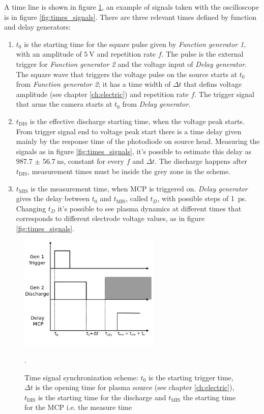 A time line is shown in figure \ref{fig:times}, an example of signals taken with the oscilloscope is in figure \ref{fig:times_signals}. There are three relevant times defined by function and delay generators:
\begin{enumerate}
 \item $t_{0}$ is the starting time for the square pulse given by \emph{Function generator 1}, with an amplitude of $\SI{5}{\volt}$ and repetition rate $f$. The pulse is the external trigger for \emph{Function generator 2} and the voltage input of \emph{Delay generator}. The square wave that triggers the voltage pulse on the source starts at $t_{0}$ from \emph{Function generator 2}; it has a time width of $\Delta t$ that defins voltage amplitude (see chapter \ref{ch:electric}) and repetition rate $f$. The trigger signal that arms the camera starts at $t_{0}$ from \emph{Delay generator}.
 \item $t_{\text{DIS}}$ is the effective discharge starting time, when the voltage peak starts. From trigger signal end to voltage peak start there is a time delay given mainly by the response time of the photodiode on source head. Measuring the signals as in figure \ref{fig:times_signals}, it's possible to estimate this delay as $\SI{987.7(567)}{\nano\second}$, constant for every $f$ and $\Delta t$. The discharge happens after $t_{\text{DIS}}$, measurement times must be inside the grey zone in the scheme.
 \item $t_{\text{MIS}}$ is the measurement time, when MCP is triggered on. \emph{Delay generator} gives the delay between $t_{0}$ and $t_{\text{MIS}}$, called $t_{D}$, with possible steps of \SI{1}{\pico\second}. Changing $t_{D}$ it's possible to see plasma dynamics at different times that corresponds to different electrode voltage values, as in figure \ref{fig:times_signals}.
\end{enumerate}
\begin{figure}
 \centering
 \includegraphics[width=0.6\textwidth]{Images/Shape/times.png}
 \caption{Time signal synchronization scheme: $t_{0}$ is the starting trigger time, $\Delta t$ is the opening time for plasma source (see chapter \ref{ch:electric}), $t_{\text{DIS}}$ is the starting time for the discharge and $t_{\text{MIS}}$ the starting time for the MCP i.e. the measure time}.
 \label{fig:times}
\end{figure}
